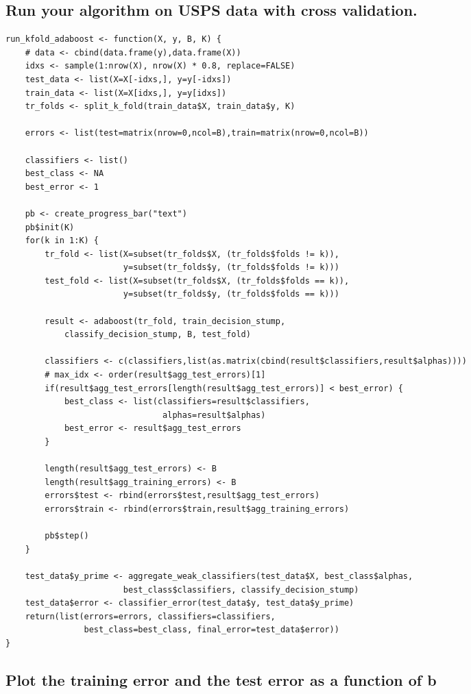 \documentclass[11pt]{article}
\theoremstyle{quest}
\newcommand{\subproblem}[1]{\subsection{#1}}      %
\begin{document}
\subproblem{Run your algorithm on USPS data with cross validation.}
\begin{adjustwidth}{3.5em}{0em}  
\begin{lstlisting}
run_kfold_adaboost <- function(X, y, B, K) {
    # data <- cbind(data.frame(y),data.frame(X))
    idxs <- sample(1:nrow(X), nrow(X) * 0.8, replace=FALSE)
    test_data <- list(X=X[-idxs,], y=y[-idxs])
    train_data <- list(X=X[idxs,], y=y[idxs])
    tr_folds <- split_k_fold(train_data$X, train_data$y, K)

    errors <- list(test=matrix(nrow=0,ncol=B),train=matrix(nrow=0,ncol=B))

    classifiers <- list()
    best_class <- NA
    best_error <- 1

    pb <- create_progress_bar("text")
    pb$init(K)
    for(k in 1:K) {
        tr_fold <- list(X=subset(tr_folds$X, (tr_folds$folds != k)),
                        y=subset(tr_folds$y, (tr_folds$folds != k)))
        test_fold <- list(X=subset(tr_folds$X, (tr_folds$folds == k)),
                        y=subset(tr_folds$y, (tr_folds$folds == k)))

        result <- adaboost(tr_fold, train_decision_stump,
            classify_decision_stump, B, test_fold)

        classifiers <- c(classifiers,list(as.matrix(cbind(result$classifiers,result$alphas))))
        # max_idx <- order(result$agg_test_errors)[1]
        if(result$agg_test_errors[length(result$agg_test_errors)] < best_error) {
            best_class <- list(classifiers=result$classifiers,
                                alphas=result$alphas)
            best_error <- result$agg_test_errors
        }

        length(result$agg_test_errors) <- B
        length(result$agg_training_errors) <- B
        errors$test <- rbind(errors$test,result$agg_test_errors)
        errors$train <- rbind(errors$train,result$agg_training_errors)

        pb$step()
    }

    test_data$y_prime <- aggregate_weak_classifiers(test_data$X, best_class$alphas, 
                        best_class$classifiers, classify_decision_stump)
    test_data$error <- classifier_error(test_data$y, test_data$y_prime)
    return(list(errors=errors, classifiers=classifiers,
                best_class=best_class, final_error=test_data$error))
}
\end{lstlisting}
\end{adjustwidth}




\subproblem{Plot the training error and the test error as a function of b}
\begin{adjustwidth}{3.5em}{0em}  
\begin{lstlisting}

\end{lstlisting}
\end{adjustwidth}

\end{document}
